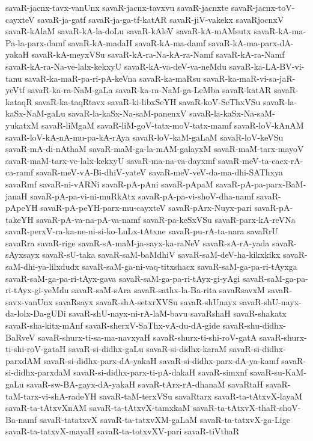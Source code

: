 {savaR-jacnx-tavx-vanUnx
savaR-jacnx-tavxvu
savaR-jacnxte
savaR-jacnx-toV-cayxteV
savaR-ja-gatf
savaR-ja-ga-tf-katAR
savaR-jiV-vakekx
savaRjocnxV
savaR-kAlaM
savaR-kA-la-doLu
savaR-kAleV
savaR-kA-mAMsutx
savaR-kA-ma-Pa-la-parx-damf
savaR-kA-madaH
savaR-kA-ma-damf
savaR-kA-ma-parx-dA-yakaH
savaR-kA-meyxVSu
savaR-kA-ra-Na-kA-ra-Namf
savaR-kA-ra-Namf
savaR-kA-ra-Na-ve-lalx-kekxyU
savaR-kA-va-deV-va-neMdu
savaR-ka-LA-BV-vi-tanu
savaR-ka-maR-pa-ri-pA-keVna
savaR-ka-maRsu
savaR-ka-maR-vi-sa-jaR-yeVtf
savaR-ka-ra-NaM-gaLa
savaR-ka-ra-NaM-ga-LeMba
savaR-katAR
savaR-kataqR
savaR-ka-taqRtavx
savaR-ki-libxSeYH
savaR-koV-SeThxVSu
savaR-la-kaSx-NaM-gaLu
savaR-la-kaSx-Na-saM-panenxV
savaR-la-kaSx-Na-saM-yukatxM
savaR-liMgaM
savaR-liM-goV-tatx-moV-tatx-mamf
savaR-loV-kAnAM
savaR-loV-kA-nA-mu-pa-kA-rAya
savaR-loV-kaM-gaLaM
savaR-loV-keVSu
savaR-mA-di-nAthaM
savaR-maM-ga-la-mAM-galayxM
savaR-maM-tarx-mayoV
savaR-maM-tarx-ve-lalx-kekxyU
savaR-ma-na-va-dayxmf
savaR-meV-ta-cacx-rA-ca-ramf
savaR-meV-vA-Bi-dhiV-yateV
savaR-meV-veV-da-ma-dhi-SAThxya
savaRmf
savaR-ni-vARNi
savaR-pA-pAni
savaR-pApaM
savaR-pA-pa-parx-BaM-janaH
savaR-pA-pa-vi-ni-muRkAtx
savaR-pA-pa-vi-shoV-dha-namf
savaR-pApeYH
savaR-pA-peYH-parx-mu-cayxteV
savaR-pArx-Nuyx-pari
savaR-pA-takeYH
savaR-pA-va-na-pA-va-namf
savaR-pa-keSxVSu
savaR-parx-kA-reVNa
savaR-perxV-ra-ka-ne-ni-si-ko-LuLx-tAtxne
savaR-pu-rA-ta-nara
savaRrU
savaRra
savaR-rige
savaR-sA-maM-ja-sayx-ka-raNeV
savaR-sA-rA-yada
savaR-sAyxsayx
savaR-sU-taka
savaR-saM-baMdhiV
savaR-saM-deV-ha-kikxkikx
savaR-saM-dhi-ya-lilxdudx
savaR-saM-ga-ni-vaq-titxshacx
savaR-saM-ga-pa-ri-tAyxga
savaR-saM-ga-pa-ri-tAyx-gava
savaR-saM-ga-pa-ri-tAyx-gi-yAgi
savaR-saM-ga-pa-ri-tAyx-gi-yeMdu
savaR-saM-sAra
savaR-sathx-la-Ba-rita
savaRsavxM
savaR-savx-vanUnx
savaRsayx
savaR-shA-setxrXVSu
savaR-shUnayx
savaR-shU-nayx-da-lolx-Da-gUDi
savaR-shU-nayx-ni-rA-laM-bavu
savaRshaH
savaR-shakatx
savaR-sha-kitx-mAnf
savaR-sherxV-SaThx-vA-du-dA-gide
savaR-shu-didhx-BaRveV
savaR-shurx-ti-sa-ma-navxyaH
savaR-shurx-ti-shi-roV-gatA
savaR-shurx-ti-shi-roV-gataH
savaR-si-didhx-gaLu
savaR-si-didhx-karaM
savaR-si-didhx-parxdAM
savaR-si-didhx-parx-dA-yakaH
savaR-si-didhx-parx-dA-ya-kamf
savaR-si-didhx-parxdaM
savaR-si-didhx-parx-ti-pA-dakaH
savaR-simxnf
savaR-su-KaM-gaLu
savaR-sw-BA-gayx-dA-yakaH
savaR-tArx-rA-dhanaM
savaRtaH
savaR-taM-tarx-vi-shA-radeYH
savaR-taM-terxVSu
savaRtarx
savaR-ta-tAtxvX-layaM
savaR-ta-tAtxvXnAM
savaR-ta-tAtxvX-tamxkaM
savaR-ta-tAtxvX-thaR-shoV-Ba-namf
savaR-tatatxvX
savaR-ta-tatxvXM-gaLaM
savaR-ta-tatxvX-ga-Lige
savaR-ta-tatxvX-mayaH
savaR-ta-totxvXV-pari
savaR-tiVthaR
}
